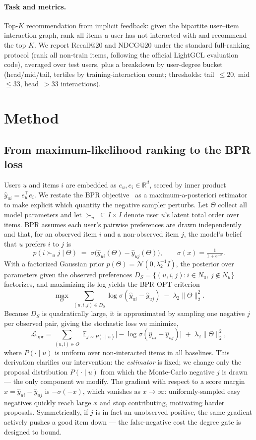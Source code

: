 \documentclass{article}
\begin{document}
\paragraph{Task and metrics.} Top-$K$ recommendation from implicit feedback: given the
bipartite user--item interaction graph, rank all items a user has not interacted with and
recommend the top $K$. We report Recall@20 and NDCG@20 under the standard full-ranking
protocol (rank all non-train items, following the official LightGCL evaluation code),
averaged over test users, plus a breakdown by user-degree bucket (head/mid/tail, tertiles
by training-interaction count; thresholds: tail~$\le 20$, mid~$\le 33$, head~$>33$
interactions).

\section{Method}
\label{sec:method}

\subsection{From maximum-likelihood ranking to the BPR loss}
Users $u$ and items $i$ are embedded as $e_u, e_i \in \mathbb{R}^d$, scored by inner
product $\hat y_{ui} = e_u^\top e_i$. We restate the BPR objective~\cite{bpr} as a
maximum-a-posteriori estimator to make explicit which quantity the negative sampler
perturbs. Let $\Theta$ collect all model parameters and let $\succ_u\;\subseteq I\times I$
denote user $u$'s latent total order over items. BPR assumes each user's pairwise
preferences are drawn independently and that, for an observed item $i$ and a non-observed
item $j$, the model's belief that $u$ prefers $i$ to $j$ is
\[
p(i \succ_u j \mid \Theta) \;=\; \sigma\!\big(\hat y_{ui}(\Theta) - \hat y_{uj}(\Theta)\big),
\qquad \sigma(x)=\tfrac{1}{1+e^{-x}}.
\]
With a factorized Gaussian prior $p(\Theta)=\mathcal{N}(0,\lambda_2^{-1}I)$, the
posterior over parameters given the observed preferences $D_S=\{(u,i,j): i\in N_u,\,
j\notin N_u\}$ factorizes, and maximizing its log yields the BPR-OPT criterion
\[
\max_{\Theta}\;\sum_{(u,i,j)\in D_S}\log\sigma(\hat y_{ui}-\hat y_{uj})
\;-\;\lambda_2\lVert\Theta\rVert_2^2 .
\]
Because $D_S$ is quadratically large, it is approximated by sampling one negative
$j$ per observed pair, giving the stochastic loss we minimize,
\[
\mathcal{L}_{\mathrm{bpr}}
= \sum_{(u,i)\in O}\;\mathbb{E}_{j\sim P(\cdot\mid u)}
\big[-\log\sigma(\hat y_{ui}-\hat y_{uj})\big]
\;+\;\lambda_2\lVert\Theta\rVert_2^2 ,
\]
where $P(\cdot\mid u)$ is uniform over non-interacted items in all baselines. This
derivation clarifies our intervention: the \emph{estimator} is fixed; we change only the
proposal distribution $P(\cdot\mid u)$ from which the Monte-Carlo negative $j$ is drawn ---
the only component we modify. The gradient with respect to a score margin
$x=\hat y_{ui}-\hat y_{uj}$ is $-\sigma(-x)$, which vanishes as $x\!\to\!\infty$:
uniformly-sampled easy negatives quickly reach large $x$ and stop contributing,
motivating harder proposals. Symmetrically, if $j$ is in fact an unobserved
positive, the same gradient actively pushes a good item down --- the false-negative
cost the degree gate is designed to bound.
\end{document}
